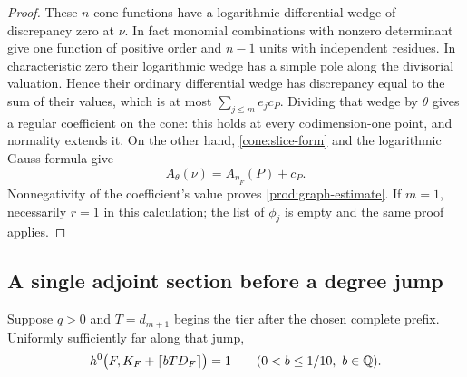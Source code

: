 \begin{proof}
These $n$ cone functions have a logarithmic differential wedge of
discrepancy zero at $\nu$.  In fact monomial combinations with nonzero
determinant give one function of positive order and $n-1$ units with
independent residues.  In characteristic zero their logarithmic wedge
has a simple pole along the divisorial valuation.  Hence their ordinary
differential wedge has discrepancy equal to the sum of their values,
which is at most $\sum_{j\leq m}e_jc_P$.  Dividing that wedge by
$\theta$ gives a regular coefficient on the cone: this holds at every
codimension-one point, and normality extends it.  On the other hand,
\eqref{cone:slice-form} and the logarithmic Gauss formula give
\[
 A_\theta(\nu)=A_{\eta_F}(P)+c_P.
\]
Nonnegativity of the coefficient's value proves
\eqref{prod:graph-estimate}.  If $m=1$, necessarily $r=1$ in this
calculation; the list of $\phi_j$ is empty and the same proof applies.
\end{proof}

\subsection{A single adjoint section before a degree jump}

\begin{lemma}\label{prod:one-section}
Suppose $q>0$ and $T=d_{m+1}$ begins the tier after the chosen complete
prefix.  Uniformly sufficiently far along that jump,
\begin{equation}\label{prod:adjoint-unique}
 h^0\bigl(F,K_F+\lceil bTD_F\rceil\bigr)=1
 \qquad(0<b\leq1/10,\ b\in\mathbb Q).
\end{equation}
\end{lemma}

